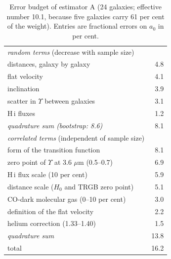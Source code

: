 \documentclass[fleqn,usenatbib]{mnras}
\begin{document}
\begin{table}
\caption{Error budget of estimator A (24 galaxies; effective number 10.1, because five galaxies carry 61 per cent of the weight). Entries are fractional errors on $a_0$ in per cent.}
\label{tab:budget}
\begin{tabular}{lr}
\toprule
\emph{random terms} (decrease with sample size) & \\
\quad distances, galaxy by galaxy & 4.8\\
\quad flat velocity & 4.1\\
\quad inclination & 3.9\\
\quad scatter in $\Upsilon$ between galaxies & 3.1\\
\quad H\,{\sc i} fluxes & 1.2\\
\quad \emph{quadrature sum (bootstrap: 8.6)} & 8.1\\
\midrule
\emph{correlated terms} (independent of sample size) & \\
\quad form of the transition function & 8.1\\
\quad zero point of $\Upsilon$ at 3.6 $\mu$m (0.5--0.7) & 6.9\\
\quad H\,{\sc i} flux scale (10 per cent) & 5.9\\
\quad distance scale ($H_0$ and TRGB zero point) & 5.1\\
\quad CO-dark molecular gas (0--10 per cent) & 3.0\\
\quad definition of the flat velocity & 2.2\\
\quad helium correction (1.33--1.40) & 1.5\\
\quad \emph{quadrature sum} & 13.8\\
\midrule
total & 16.2\\
\bottomrule
\end{tabular}
\end{table}
\end{document}
